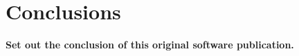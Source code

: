 \section{Conclusions}
\label{} 

\textbf{Set out the conclusion of this original software publication.}

  
